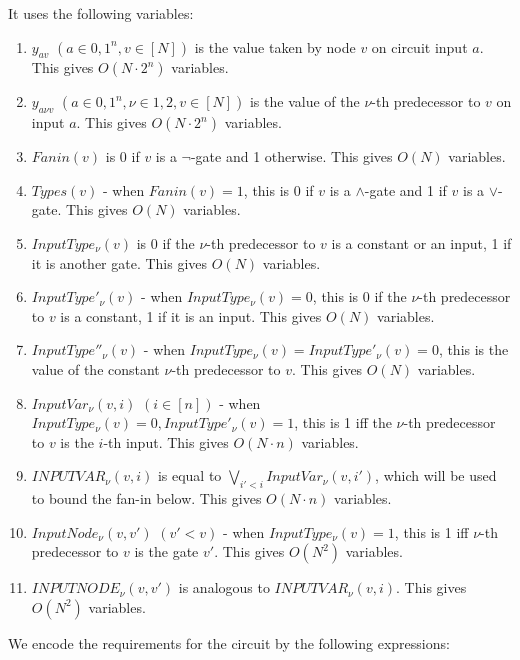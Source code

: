 \documentclass{article}
\begin{document}
It uses the following variables:

\begin{enumerate}

  \item $y_{av}$ $(a \in {0,1}^n, v \in [N])$ is the value taken by node $v$ on circuit input $a$. This gives $O(N \cdot2^n)$ variables.
  \item $y_{a\nu v}$ $(a \in {0,1}^n, \nu \in {1,2}, v \in [N])$ is the value of the $\nu$-th predecessor to $v$ on input $a$. This gives $O(N \cdot 2^n)$ variables.
  \item $Fanin(v)$ is 0 if $v$ is a $\neg$-gate and 1 otherwise. This gives $O(N)$ variables.
  \item $Types(v)$ - when $Fanin(v)=1$, this is 0 if $v$ is a $\land$-gate and 1 if $v$ is a $\lor$-gate. This gives $O(N)$ variables.
  \item $InputType_\nu(v)$ is 0 if the $\nu$-th predecessor to $v$ is a constant or an input, 1 if it is another gate. This gives $O(N)$ variables.
  \item $InputType'_\nu(v)$ - when $InputType_{\nu}(v) = 0$, this is 0 if the $\nu$-th predecessor to $v$ is a constant, 1 if it is an input. This gives $O(N)$ variables.
  \item $InputType''_\nu(v)$ - when $InputType_{\nu}(v) = InputType'_{\nu}(v) = 0$, this is the value of the constant $\nu$-th predecessor to $v$. This gives $O(N)$ variables.
  \item $InputVar_\nu(v,i)$ $(i \in [n])$ - when $InputType_{\nu}(v) = 0, InputType'_{\nu}(v) = 1$, this is 1 iff the $\nu$-th predecessor to $v$ is the $i$-th input. This gives $O(N \cdot n)$ variables.
  \item $INPUTVAR_\nu(v,i)$ is equal to $\bigvee_{i'<i} InputVar_\nu(v,i')$, which will be used to bound the fan-in below. This gives $O(N \cdot n)$ variables.
  \item $InputNode_\nu(v,v')$ $(v' < v)$ - when $InputType_{\nu}(v) = 1$, this is 1 iff $\nu$-th predecessor to $v$ is the gate $v'$. This gives $O(N^2)$ variables.
  \item $INPUTNODE_\nu(v,v')$ is analogous to $INPUTVAR_\nu(v,i)$. This gives $O(N^2)$ variables.
  
\end{enumerate}

We encode the requirements for the circuit by the following expressions:
\end{document}
